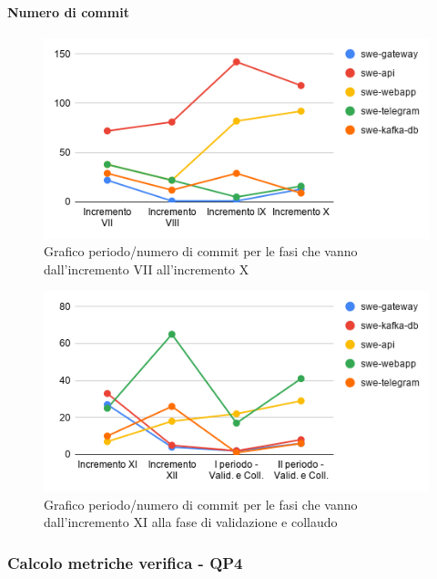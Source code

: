 \paragraph{Numero di commit}
\begin{figure}[H]
			\centering
			\includegraphics[width=0.8\linewidth]{./res/images/QM-PROC-10-NCOM.png}
			\caption{Grafico periodo/numero di commit per le fasi che vanno dall'incremento VII all'incremento X}
			\label{fig:Grafico periodo/numero di commit per le fasi che vanno dall'incremento VII all'incremento X}
	\end{figure}
	\begin{figure}[H]
			\centering
			\includegraphics[width=0.8\linewidth]{./res/images/QM-PROC-10-NCOM_1.png}
			\caption{Grafico periodo/numero di commit per le fasi che vanno dall'incremento XI alla fase di validazione e collaudo}
			\label{fig:Grafico periodo/numero di commit per le fasi che vanno dall'incremento XI alla fase di validazione e collaudo}
	\end{figure}

\subsubsection{Calcolo metriche verifica - QP4}	
